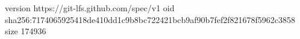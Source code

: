 version https://git-lfs.github.com/spec/v1
oid sha256:7174065925418de410dd1c9b8bc722421bcb9af90b7fef2f821678f5962c3858
size 174936
